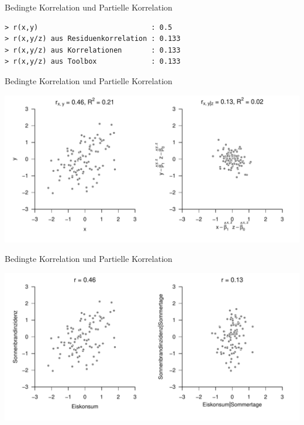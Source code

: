 \documentclass[
  8pt,
  ignorenonframetext,
]{beamer}
\begin{document}
\begin{frame}[fragile]{Bedingte Korrelation und Partielle Korrelation}
\begin{verbatim}
> r(x,y)                           : 0.5 
> r(x,y/z) aus Residuenkorrelation : 0.133 
> r(x,y/z) aus Korrelationen       : 0.133 
> r(x,y/z) aus Toolbox             : 0.133
\end{verbatim}
\end{frame}

\begin{frame}{Bedingte Korrelation und Partielle Korrelation}
\protect\hypertarget{bedingte-korrelation-und-partielle-korrelation-13}{}
\vspace{1cm}

\begin{center}\includegraphics[width=1\linewidth]{2_Abbildungen/alm_2_partielle_korrelation_beispiel} \end{center}
\end{frame}

\begin{frame}{Bedingte Korrelation und Partielle Korrelation}
\protect\hypertarget{bedingte-korrelation-und-partielle-korrelation-14}{}
\vspace{1cm}

\begin{center}\includegraphics[width=1\linewidth]{2_Abbildungen/alm_2_partielle_korrelation_anwendung} \end{center}
\end{frame}
\end{document}
